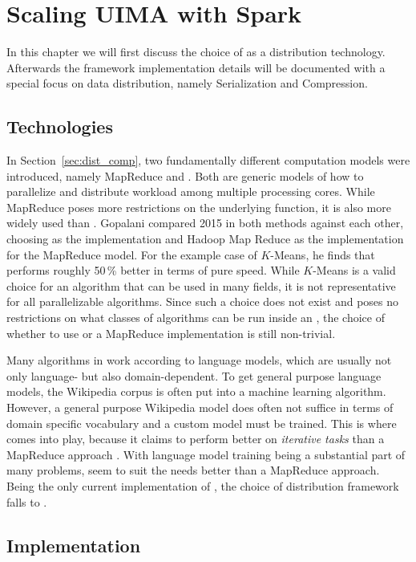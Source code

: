 \chapter{Scaling UIMA with Spark}
\label{ch:implementation}
In this chapter we will first discuss the choice of \spark{} as a distribution technology. Afterwards the framework implementation details will be documented with a special focus on data distribution, namely Serialization and Compression.
\section{Technologies}
In Section~\ref{sec:dist_comp}, two fundamentally different computation models were introduced, namely MapReduce and \rdds{}. Both are generic models of how to parallelize and distribute workload among multiple processing cores. While MapReduce poses more restrictions on the underlying function, it is also more widely used than \rdds{}. Gopalani compared 2015 in \cite{gopalani2015comparing} both methods against each other, choosing \spark{} as the \rdd{} implementation and Hadoop Map Reduce as the implementation for the MapReduce model. For the example case of $K$-Means, he finds that \spark{} performs roughly 50\,\% better in terms of pure speed. While $K$-Means is a valid choice for an algorithm that can be used in many fields, it is not representative for all parallelizable algorithms. Since such a choice does not exist and \uima{} poses no restrictions on what classes of algorithms can be run inside an \anen{}, the choice of whether to use \rdds{} or a MapReduce implementation is still non-trivial.

Many algorithms in \nlp{} work according to language models, which are usually not only language- but also domain-dependent. To get general purpose language models, the Wikipedia corpus is often put into a machine learning algorithm. However, a general purpose Wikipedia model does often not suffice in terms of domain specific vocabulary and a custom model must be trained. This is where \spark{} comes into play, because it claims to perform better on \emph{iterative tasks} than a MapReduce approach \cite{willmapreduce}. With language model training being a substantial part of many \nlp{} problems, \rdds{} seem to suit the \nlp{} needs better than a MapReduce approach. Being the only current implementation of \rdds{}, the choice of distribution framework falls to \spark{}.
\section{Implementation}

